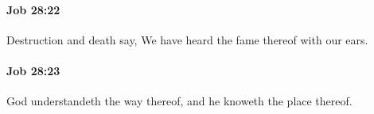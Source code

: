 		\paragraph{Job 28:22} %
			\label{JOB-28-22}

			Destruction and death say, We have heard the fame thereof with our ears.


		\paragraph{Job 28:23} %
			\label{JOB-28-23}

			God understandeth the way thereof, and he knoweth the place thereof.


